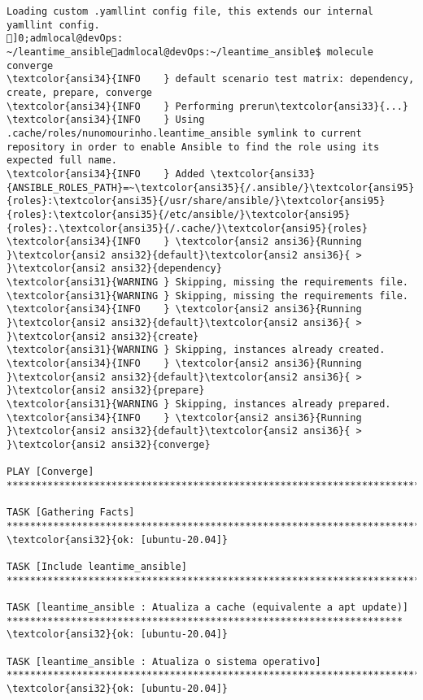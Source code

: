 \documentclass{scrartcl}
\begin{document}
\begin{Verbatim}
Loading custom .yamllint config file, this extends our internal yamllint config.
]0;admlocal@devOps: ~/leantime_ansibleadmlocal@devOps:~/leantime_ansible$ molecule converge
\textcolor{ansi34}{INFO    } default scenario test matrix: dependency, create, prepare, converge
\textcolor{ansi34}{INFO    } Performing prerun\textcolor{ansi33}{...}
\textcolor{ansi34}{INFO    } Using .cache/roles/nunomourinho.leantime_ansible symlink to current repository in order to enable Ansible to find the role using its expected full name.
\textcolor{ansi34}{INFO    } Added \textcolor{ansi33}{ANSIBLE_ROLES_PATH}=~\textcolor{ansi35}{/.ansible/}\textcolor{ansi95}{roles}:\textcolor{ansi35}{/usr/share/ansible/}\textcolor{ansi95}{roles}:\textcolor{ansi35}{/etc/ansible/}\textcolor{ansi95}{roles}:.\textcolor{ansi35}{/.cache/}\textcolor{ansi95}{roles}
\textcolor{ansi34}{INFO    } \textcolor{ansi2 ansi36}{Running }\textcolor{ansi2 ansi32}{default}\textcolor{ansi2 ansi36}{ > }\textcolor{ansi2 ansi32}{dependency}
\textcolor{ansi31}{WARNING } Skipping, missing the requirements file.
\textcolor{ansi31}{WARNING } Skipping, missing the requirements file.
\textcolor{ansi34}{INFO    } \textcolor{ansi2 ansi36}{Running }\textcolor{ansi2 ansi32}{default}\textcolor{ansi2 ansi36}{ > }\textcolor{ansi2 ansi32}{create}
\textcolor{ansi31}{WARNING } Skipping, instances already created.
\textcolor{ansi34}{INFO    } \textcolor{ansi2 ansi36}{Running }\textcolor{ansi2 ansi32}{default}\textcolor{ansi2 ansi36}{ > }\textcolor{ansi2 ansi32}{prepare}
\textcolor{ansi31}{WARNING } Skipping, instances already prepared.
\textcolor{ansi34}{INFO    } \textcolor{ansi2 ansi36}{Running }\textcolor{ansi2 ansi32}{default}\textcolor{ansi2 ansi36}{ > }\textcolor{ansi2 ansi32}{converge}

PLAY [Converge] **************************************************************************************************************************

TASK [Gathering Facts] *******************************************************************************************************************
\textcolor{ansi32}{ok: [ubuntu-20.04]}

TASK [Include leantime_ansible] **********************************************************************************************************

TASK [leantime_ansible : Atualiza a cache (equivalente a apt update)] ********************************************************************
\textcolor{ansi32}{ok: [ubuntu-20.04]}

TASK [leantime_ansible : Atualiza o sistema operativo] ***********************************************************************************
\textcolor{ansi32}{ok: [ubuntu-20.04]}


\end{Verbatim}
\end{document}
